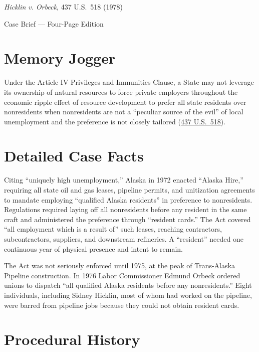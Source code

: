 \documentclass[12pt]{article}
\begin{document}
\begin{center}
{\LARGE \textit{Hicklin v. Orbeck}, 437 U.S.\ 518 (1978)\par}
\vspace{0.8em}
{\large Case Brief --- Four-Page Edition\par}
\end{center}
\vspace{1em}

\section{Memory Jogger}

Under the Article IV Privileges and Immunities Clause, a State may not leverage its ownership of natural resources to force private employers throughout the economic ripple effect of resource development to prefer all state residents over nonresidents when nonresidents are not a ``peculiar source of the evil'' of local unemployment and the preference is not closely tailored (\href{https://supreme.justia.com/cases/federal/us/437/518/}{437 U.S.\ 518}).

\section{Detailed Case Facts}

Citing ``uniquely high unemployment,'' Alaska in 1972 enacted ``Alaska Hire,'' requiring all state oil and gas leases, pipeline permits, and unitization agreements to mandate employing ``qualified Alaska residents'' in preference to nonresidents. Regulations required laying off all nonresidents before any resident in the same craft and administered the preference through ``resident cards.'' The Act covered ``all employment which is a result of'' such leases, reaching contractors, subcontractors, suppliers, and downstream refineries. A ``resident'' needed one continuous year of physical presence and intent to remain.

The Act was not seriously enforced until 1975, at the peak of Trans-Alaska Pipeline construction. In 1976 Labor Commissioner Edmund Orbeck ordered unions to dispatch ``all qualified Alaska residents before any nonresidents.'' Eight individuals, including Sidney Hicklin, most of whom had worked on the pipeline, were barred from pipeline jobs because they could not obtain resident cards.

\section{Procedural History}
\end{document}
